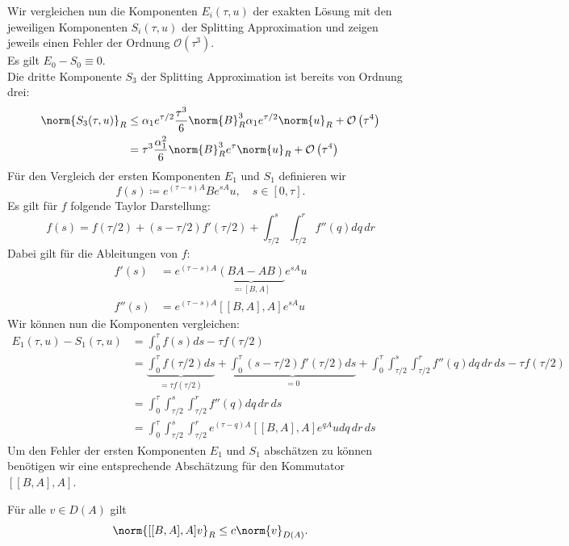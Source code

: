Wir vergleichen nun die Komponenten $E_i(\tau,u)$ der exakten Lösung mit den jeweiligen Komponenten $S_i(\tau,u)$ der Splitting Approximation und zeigen jeweils einen Fehler der Ordnung $\mathcal{O}\left(\tau^3\right)$.\\
Es gilt $E_0-S_0\equiv 0$.\\
Die dritte Komponente $S_3$ der Splitting Approximation ist bereits von Ordnung drei:
\begin{align*}
\norm{S_3(\tau,u)}_R&\le \alpha_1e^{\tau/2}\frac{\tau^3}{6}\norm{B}^3_R\alpha_1e^{\tau/2}\norm{u}_R+\mathcal{O}\left(\tau^4\right)\\
&= \tau^3\frac{\alpha_1^2}{6}\norm{B}^3_Re^\tau\norm{u}_R+\mathcal{O}\left(\tau^4\right)
\end{align*}
Für den Vergleich der ersten Komponenten $E_1$ und $S_1$ definieren wir
\[f(s)\coloneqq e^{(\tau - s)A}Be^{sA}u,\quad s\in[0,\tau].\]
Es gilt für $f$ folgende Taylor Darstellung:
\[f(s)=f(\tau/2)+(s-\tau/2)f'(\tau/2)+\int_{\tau/2}^s\int_{\tau/2}^rf''(q)dq\,dr\]
Dabei gilt für die Ableitungen von $f$:
\begin{align*}
f'(s)&=e^{(\tau -s)A}\underbrace{(BA-AB)}_{\eqqcolon [B,A]}e^{sA}u\\
f''(s)&=e^{(\tau -s)A}[[B,A],A]e^{sA}u
\end{align*}
Wir können nun die Komponenten vergleichen:
\begin{align}
E_1(\tau,u)-S_1(\tau,u)&=\int_0^\tau f(s)ds-\tau f(\tau/2)\nonumber\\
&=\underbrace{\int_0^\tau f(\tau/2)ds}_{=\tau f(\tau/2)}+\underbrace{\int_0^\tau (s-\tau/2)f'(\tau/2)ds}_{=0}+\int_0^\tau\int_{\tau/2}^s\int_{\tau/2}^rf''(q)dq\,dr\,ds-\tau f(\tau/2)\nonumber\\
&=\int_0^\tau\int_{\tau/2}^s\int_{\tau/2}^r f''(q)dq\,dr\,ds\nonumber\\
&=\int_0^\tau\int_{\tau/2}^s\int_{\tau/2}^r e^{(\tau -q)A}[[B,A],A]e^{qA}udq\,dr\,ds\label{eqn:order_first_components}
\end{align}
Um den Fehler der ersten Komponenten $E_1$ und $S_1$ abschätzen zu können benötigen wir eine entsprechende Abschätzung für den Kommutator $[[B,A],A]$.
\begin{mathlemma}[Kommutatorabschätzung]
\label{lemma:commutator}
Für alle $v\in D(A)$ gilt
\[\norm{[[B,A],A]v}_R\le c\norm{v}_{D(A)}.\]
\end{mathlemma}
